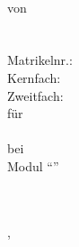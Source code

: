 

\ifx\event\undefined
\else
	\date[\mydate]{\today}
\fi

\expandafter\def\expandafter\quote\expandafter{\quote\onehalfspacing}

\doublespacing
\parindent 0pt
\parskip 12pt




\thispagestyle{empty}
\begin{titlepage}
\singlespacing
\begin{center}


\quad\\[5cm]



{%
    \normalfont\bfseries\Large\onehalfspacing
    \titel \par}
    \vskip 3.5cm

von \\[0.3cm]

\autor \\
\email \\
Matrikelnr.: \matrikelnummer \\
Kernfach:  \\
Zweitfach: \zweitfach \\[2cm]

für \\[0.3cm]

\veranstaltung \\
bei \dozentin \\
Modul "`\modul"' \\
\institut \\
\universitaet \\
\semester

\vfill

\ort, \datum


\end{center}
\end{titlepage}

\restoregeometry

\setcounter{page}{2}
{\singlespacing \tableofcontents}
\pagebreak

\setcounter{page}{1}
